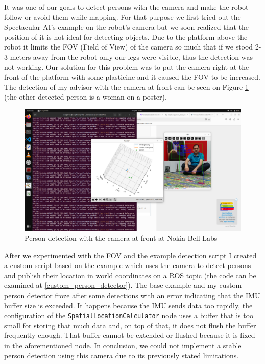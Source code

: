 It was one of our goals to detect persons with the camera and make the robot follow or avoid them while mapping. For that purpose we first tried out the Spectacular AI's example on the robot's camera but we soon realized that the position of it is not ideal for detecting objects. Due to the platform above the robot it limits the FOV (Field of View) of the camera so much that if we stood 2-3 meters away from the robot only our legs were visible, thus the detection was not working. Our solution for this problem was to put the camera right at the front of the platform with some plasticine and it caused the FOV to be increased. The detection of my advisor with the camera at front can be seen on Figure \ref{fig:person_detection_camera_at_front_nokia} (the other detected person is a woman on a poster).

\begin{figure}[htbp]
    \centering
    \includegraphics[width=150mm, keepaspectratio]{figures/person_detection_camera_at_front_nokia.png}
    \caption{Person detection with the camera at front at Nokia Bell Labs}
    \label{fig:person_detection_camera_at_front_nokia}
\end{figure}

After we experimented with the FOV and the example detection script I created a custom script based on the example which uses the camera to detect persons and publish their location in world coordinates on a ROS topic (the code can be examined at \ref{custom_person_detector}). The base example and my custom person detector froze after some detections with an error indicating that the IMU buffer size is exceeded. It happens because the IMU sends data too rapidly, the configuration of the \verb|SpatialLocationCalculator| node uses a buffer that is too small for storing that much data and, on top of that, it does not flush the buffer frequently enough. That buffer cannot be extended or flushed because it is fixed in the aforementioned node. In conclusion, we could not implement a stable person detection using this camera due to its previously stated limitations.
